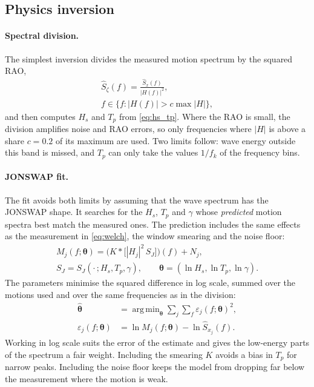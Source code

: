 \documentclass[10pt,a4paper,twocolumn,twoside]{article}
\newcommand{\Hs}{H_{s}}
\newcommand{\Tp}{T_{p}}
\newcommand{\vect}[1]{\boldsymbol{#1}}
\DeclareMathOperator*{\argmin}{arg\,min}
\begin{document}
\subsection{Physics inversion}
\label{sec:theory_inverse}

\paragraph{Spectral division.}
The simplest inversion divides the measured motion spectrum by the squared RAO,
\begin{equation}
\begin{gathered}
\hat S_\zeta(f) = \frac{\hat S_x(f)}{|H(f)|^2},
\\
f \in \{ f : |H(f)| > c \max |H| \},
\end{gathered}
\label{eq:division}
\end{equation}
and then computes $\Hs$ and $\Tp$ from \cref{eq:hs_tp}. Where the RAO is small, the division
amplifies noise and RAO errors, so only frequencies where $|H|$ is above a share $c = 0.2$ of its
maximum are used. Two limits follow: wave energy outside this band is missed, and $\Tp$ can only
take the values $1/f_k$ of the frequency bins.

\paragraph{JONSWAP fit.}
The fit avoids both limits by assuming that the wave spectrum has the JONSWAP shape. It searches
for the $\Hs$, $\Tp$ and $\gamma$ whose \emph{predicted} motion spectra best match the measured
ones. The prediction includes the same effects as the measurement in \cref{eq:welch}, the window
smearing and the noise floor:
\begin{equation}
\begin{gathered}
M_j(f; \vect\theta) = \big( K * \big[ |H_j|^2\, S_J \big] \big)(f) + N_j, \\
S_J = S_J(\cdot\,; \Hs, \Tp, \gamma), \qquad \vect\theta = (\ln\Hs, \ln\Tp, \ln\gamma).
\end{gathered}
\label{eq:model}
\end{equation}
The parameters minimise the squared difference in log scale, summed over the motions used and over
the same frequencies as in the division:
\begin{equation}
\begin{split}
\hat{\vect\theta} &= \argmin_{\vect\theta} \sum_j \sum_{f} \varepsilon_j(f; \vect\theta)^2, \\
\varepsilon_j(f; \vect\theta) &= \ln M_j(f; \vect\theta) - \ln \hat S_{x_j}(f).
\end{split}
\label{eq:fit}
\end{equation}
Working in log scale suits the error of the estimate and gives the low-energy parts of the spectrum
a fair weight. Including the smearing $K$ avoids a bias in $\Tp$ for narrow peaks. Including the
noise floor keeps the model from dropping far below the measurement where the motion is weak.
\end{document}
